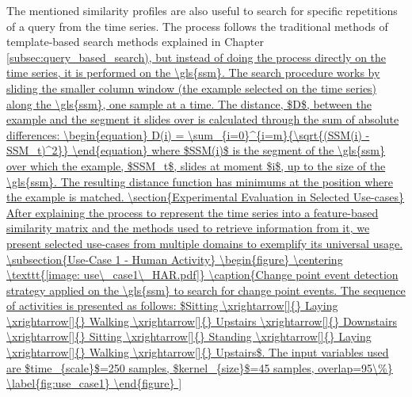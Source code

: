 The mentioned similarity profiles are also useful to search for specific repetitions of a query from the time series. The process follows the traditional methods of template-based search methods explained in Chapter \ref{subsec:query_based_search), but instead of doing the process directly on the time series, it is performed on the \gls{ssm}. The search procedure works by sliding the smaller column window (the example selected on the time series) along the \gls{ssm}, one sample at a time. The distance, $D$, between the example and the segment it slides over is calculated through the sum of absolute differences:

\begin{equation}
    D(i) = \sum_{i=0}^{i=m}{\sqrt{(SSM(i) - SSM_t)^2}}
\end{equation}

where $SSM(i)$ is the segment of the \gls{ssm} over which the example, $SSM_t$, slides at moment $i$, up to the size of the \gls{ssm}. The resulting distance function has minimums at the position where the example is matched.


\section{Experimental Evaluation in Selected Use-cases}

After explaining the process to represent the time series into a feature-based similarity matrix and the methods used to retrieve information from it, we present selected use-cases from multiple domains to exemplify its universal usage.

\subsection{Use-Case 1 - Human Activity}

\begin{figure}
    \centering
    \texttt{[image: use\_case1\_HAR.pdf]}
    \caption{Change point event detection strategy applied on the \gls{ssm} to search for change point events. The sequence of activities is presented as follows: $Sitting \xrightarrow[]{} Laying \xrightarrow[]{} Walking \xrightarrow[]{} Upstairs \xrightarrow[]{} Downstairs \xrightarrow[]{} Sitting \xrightarrow[]{} Standing \xrightarrow[]{} Laying \xrightarrow[]{} Walking \xrightarrow[]{} Upstairs$. The input variables used are $time_{scale}$=250 samples, $kernel_{size}$=45 samples, overlap=95\%}
    \label{fig:use_case1}
\end{figure}

}

